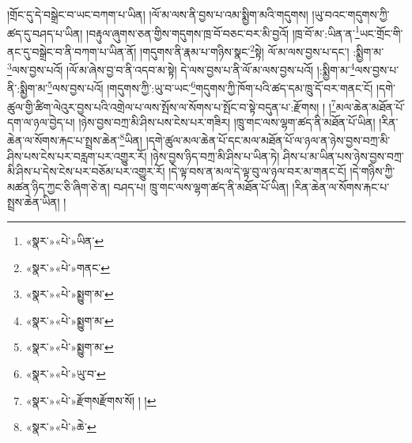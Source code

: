 །གྲོང་དུ་དེ་བསྒྲེང་བ་ཡང་བཀག་པ་ཡིན། །ལོ་མ་ལས་ནི་བྱས་པ་འམ་སྨྱིག་མའི་གདུགས། །ཡུ་བའང་གདུགས་ཀྱི་ཚད་དུ་བཤད་པ་ཡིན། །བརྟུལ་ཞུགས་ཅན་གྱིས་གདུགས་ཁྲ་བོ་བཅང་བར་མི་བྱའོ། །ཁྲ་བོ་མ་:ཡིན་ན་\footnote{«སྣར་»«པེ་»ཡིན་}ཡང་གྲོང་གི་ནང་དུ་བསྒྲེང་བ་ནི་བཀག་པ་ཡིན་ནོ། །གདུགས་ནི་རྣམ་པ་གཉིས་སྣང་\footnote{«སྣར་»«པེ་»གནང་}སྟེ། ལོ་མ་ལས་བྱས་པ་དང་། :སྨྱིག་མ་\footnote{«སྣར་»«པེ་»སྨྱུག་མ་}ལས་བྱས་པའོ། །ལོ་མ་ཞེས་བྱ་བ་ནི་འདབ་མ་སྟེ། དེ་ལས་བྱས་པ་ནི་ལོ་མ་ལས་བྱས་པའོ། །:སྨྱིག་མ་\footnote{«སྣར་»«པེ་»སྨྱུག་མ་}ལས་བྱས་པ་ནི་:སྨྱིག་མ་\footnote{«སྣར་»«པེ་»སྨྱུག་མ་}ལས་བྱས་པའོ། །གདུགས་ཀྱི་:ཡུ་བ་ཡང་\footnote{«སྣར་»«པེ་»ཡུ་བ་}གདུགས་ཀྱི་ཁོག་པའི་ཚད་དམ་ཁྲུ་དོ་བར་གནང་ངོ། །དགེ་ཚུལ་གྱི་ཚིག་ལེའུར་བྱས་པའི་འགྲེལ་པ་ལས་སྤོས་ལ་སོགས་པ་སྤོང་བ་སྟེ་བདུན་པ་:རྫོགས། ། །\footnote{«སྣར་»«པེ་»རྫོགསརྫོགས་སོ། ། །}མལ་ཆེན་མཐོན་པོ་དག་ལ་ཉལ་བྱེད་པ། །ཉེས་བྱས་བཀྲ་མི་ཤིས་པས་ངེས་པར་གཟིར། །ཁྲུ་གང་ལས་ལྷག་ཚད་ནི་མཐོན་པོ་ཡིན། །རིན་ཆེན་ལ་སོགས་རྐང་པ་སྤྲས་ཆེན་\footnote{«སྣར་»«པེ་»ཆེ་}ཡིན། །དགེ་ཚུལ་མལ་ཆེན་པོ་དང་མལ་མཐོན་པོ་ལ་ཉལ་ན་ཉེས་བྱས་བཀྲ་མི་ཤིས་པས་ངེས་པར་བརླག་པར་འགྱུར་རོ། །ཉེས་བྱས་ཉིད་བཀྲ་མི་ཤིས་པ་ཡིན་ཏེ། ཤིས་པ་མ་ཡིན་པས་ཉེས་བྱས་བཀྲ་མི་ཤིས་པ་དེས་ངེས་པར་བཅོམ་པར་འགྱུར་རོ། །དེ་ལྟ་བས་ན་མལ་དེ་ལྟ་བུ་ལ་ཉལ་བར་མ་གནང་ངོ། །དེ་གཉིས་ཀྱི་མཚན་ཉིད་ཀྱང་ཅི་ཞིག་ཅེ་ན། བཤད་པ། ཁྲུ་གང་ལས་ལྷག་ཚད་ནི་མཐོན་པོ་ཡིན། །རིན་ཆེན་ལ་སོགས་རྐང་པ་སྤྲས་ཆེན་ཡིན། །
